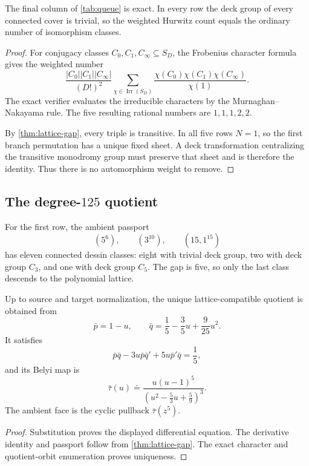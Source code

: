 \documentclass[11pt,reqno]{amsart}
\begin{document}
\begin{proposition}
\label{prop:hurwitz-count}
The final column of \cref{tab:queue} is exact.  In every row the deck group
of every connected cover is trivial, so the weighted Hurwitz count equals
the ordinary number of isomorphism classes.
\end{proposition}

\begin{proof}
For conjugacy classes \(C_0,C_1,C_\infty\subseteq S_D\), the Frobenius
character formula gives the weighted number
\[
\frac{|C_0||C_1||C_\infty|}{(D!)^2}
\sum_{\chi\in\operatorname{Irr}(S_D)}
\frac{\chi(C_0)\chi(C_1)\chi(C_\infty)}{\chi(1)}.
\]
The exact verifier evaluates the irreducible characters by the
Murnaghan--Nakayama rule.  The five resulting rational numbers are
\(1,1,1,2,2\).

By \cref{thm:lattice-gap}, every triple is transitive.  In all five rows
\(N=1\), so the first branch permutation has a unique fixed sheet.  A deck
transformation centralizing the transitive monodromy group must preserve
that sheet and is therefore the identity.  Thus there is no automorphism
weight to remove.
\end{proof}

\subsection{The degree-\texorpdfstring{\(125\)}{125} quotient}

For the first row, the ambient passport
\[
(5^6),\qquad(3^{10}),\qquad(15,1^{15})
\]
has eleven connected dessin classes: eight with trivial deck group, two
with deck group \(C_3\), and one with deck group \(C_5\).  The gap is five,
so only the last class descends to the polynomial lattice.

\begin{proposition}
\label{prop:f2-map}
Up to source and target normalization, the unique lattice-compatible
quotient is obtained from
\[
\bar p=1-u,\qquad
\bar q=\frac15-\frac35u+\frac9{25}u^2.
\]
It satisfies
\[
\bar p\bar q-3u\bar p\bar q'+5u\bar p'\bar q=\frac15,
\]
and its Belyi map is
\begin{equation}
\label{eq:f2-map}
\bar\tau(u)\doteq
\frac{u(u-1)^5}
{\left(u^2-\frac53u+\frac59\right)^3}.
\end{equation}
The ambient face is the cyclic pullback \(\bar\tau(z^5)\).
\end{proposition}

\begin{proof}
Substitution proves the displayed differential equation.  The derivative
identity and passport follow from \cref{thm:lattice-gap}.  The exact
character and quotient-orbit enumeration proves uniqueness.
\end{proof}
\end{document}
